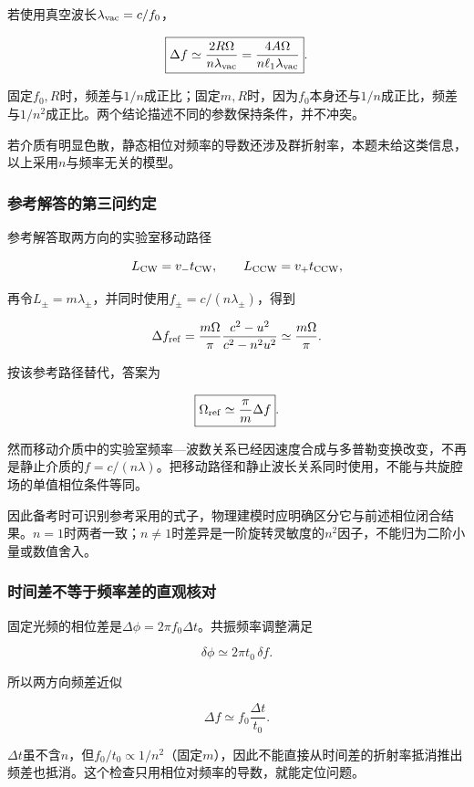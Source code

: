 \documentclass[12pt,a4paper,fontset=fandol]{ctexart}
\begin{document}
若使用真空波长\(\lambda_{\rm vac}=c/f_0\)，

\[
\boxed{
\Delta f\simeq
\frac{2R\Omega}{n\lambda_{\rm vac}}
=\frac{4A\Omega}{n\ell_1\lambda_{\rm vac}}}.
\]

固定\(f_0,R\)时，频差与\(1/n\)成正比；固定\(m,R\)时，因为\(f_0\)本身还与\(1/n\)成正比，频差与\(1/n^2\)成正比。两个结论描述不同的参数保持条件，并不冲突。

若介质有明显色散，静态相位对频率的导数还涉及群折射率，本题未给这类信息，以上采用\(n\)与频率无关的模型。

\par\noindent\begin{minipage}{\linewidth}
\subsubsection{参考解答的第三问约定}\label{ux53c2ux8003ux89e3ux7b54ux7684ux7b2cux4e09ux95eeux7ea6ux5b9a}

参考解答取两方向的实验室移动路径

\[
L_{\rm CW}=v_-t_{\rm CW},\qquad
L_{\rm CCW}=v_+t_{\rm CCW},
\]

再令\(L_\pm=m\lambda_\pm\)，并同时使用\(f_\pm=c/(n\lambda_\pm)\)，得到

\[
\Delta f_{\rm ref}
=\frac{m\Omega}{\pi}
\frac{c^2-u^2}{c^2-n^2u^2}
\simeq\frac{m\Omega}{\pi}.
\]

按该参考路径替代，答案为

\[
\boxed{\Omega_{\rm ref}\simeq\frac\pi m\Delta f}.
\]

然而移动介质中的实验室频率---波数关系已经因速度合成与多普勒变换改变，不再是静止介质的\(f=c/(n\lambda)\)。把移动路径和静止波长关系同时使用，不能与共旋腔场的单值相位条件等同。

因此备考时可识别参考采用的式子，物理建模时应明确区分它与前述相位闭合结果。\(n=1\)时两者一致；\(n\neq1\)时差异是一阶旋转灵敏度的\(n^2\)因子，不能归为二阶小量或数值舍入。

\subsubsection{时间差不等于频率差的直观核对}\label{ux65f6ux95f4ux5deeux4e0dux7b49ux4e8eux9891ux7387ux5deeux7684ux76f4ux89c2ux6838ux5bf9}

固定光频的相位差是\(\Delta\phi=2\pi f_0\Delta t\)。共振频率调整满足

\[
\delta\phi\simeq2\pi t_0\,\delta f.
\]

所以两方向频差近似

\[
\Delta f\simeq f_0\frac{\Delta t}{t_0}.
\]

\(\Delta t\)虽不含\(n\)，但\(f_0/t_0\propto1/n^2\)（固定\(m\)），因此不能直接从时间差的折射率抵消推出频差也抵消。这个检查只用相位对频率的导数，就能定位问题。

\end{minipage}\par
\end{document}

